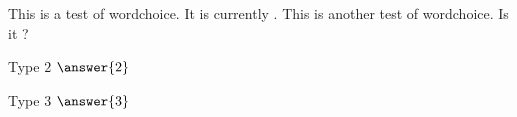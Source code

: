 \documentclass{ximera}
\begin{document}
\begin{exercise}
  This is a test of wordchoice. It is currently
  .  This is
  another test of wordchoice. Is it ?
\end{exercise}



\begin{exercise}
  Type $2$ $\answer{2}$
  \begin{hint}
    Type $3$ $\answer{3}$
  \end{hint}
\end{exercise}
\end{document}
